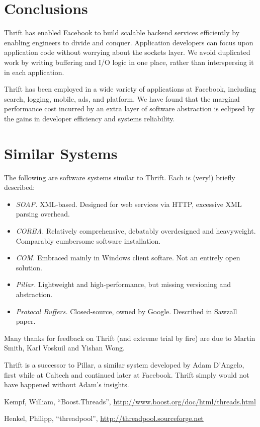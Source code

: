 \documentclass[nocopyrightspace,blockstyle]{sigplanconf}
\begin{document}
\section{Conclusions}
Thrift has enabled Facebook to build scalable backend
services efficiently by enabling engineers to divide and conquer. Application
developers can focus upon application code without worrying about the
sockets layer. We avoid duplicated work by writing buffering and I/O logic
in one place, rather than interspersing it in each application.

Thrift has been employed in a wide variety of applications at Facebook,
including search, logging, mobile, ads, and platform. We have
found that the marginal performance cost incurred by an extra layer of
software abstraction is eclipsed by the gains in developer efficiency and
systems reliability.

\appendix

\section{Similar Systems}
The following are software systems similar to Thrift. Each is (very!) briefly
described:

\begin{itemize}
\item \textit{SOAP.} XML-based. Designed for web services via HTTP, excessive
XML parsing overhead.
\item \textit{CORBA.} Relatively comprehensive, debatably overdesigned and
heavyweight. Comparably cumbersome software installation.
\item \textit{COM.} Embraced mainly in Windows client softare. Not an entirely
open solution.
\item \textit{Pillar.} Lightweight and high-performance, but missing versioning
and abstraction.
\item \textit{Protocol Buffers.} Closed-source, owned by Google. Described in
Sawzall paper.
\end{itemize}

\acks

Many thanks for feedback on Thrift (and extreme trial by fire) are due to
Martin Smith, Karl Voskuil and Yishan Wong.

Thrift is a successor to Pillar, a similar system developed
by Adam D'Angelo, first while at Caltech and continued later at Facebook.
Thrift simply would not have happened without Adam's insights.

\begin{thebibliography}{}

Kempf, William,
``Boost.Threads'',
\url{http://www.boost.org/doc/html/threads.html}

Henkel, Philipp,
``threadpool'',
\url{http://threadpool.sourceforge.net}

\end{thebibliography}
\end{document}
